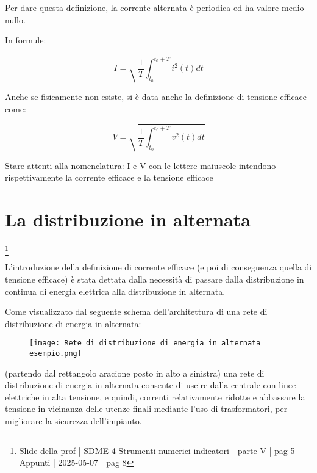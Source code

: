 Per dare questa definizione, la corrente alternata è periodica ed ha valore medio nullo. \newline 

In formule: 

{
    \Large 
    \begin{equation}
        I 
        = 
        \sqrt
        {
            \frac{1}{T}
            \int_{t_0}^{t_0 + T} 
            i^{2} (t) dt
        }
    \end{equation}
}

Anche se fisicamente non esiste, 
si è data anche la definizione di tensione efficace come: 

{
    \Large 
    \begin{equation}
        V 
        = 
        \sqrt
        {
            \frac{1}{T}
            \int_{t_0}^{t_0 + T} 
            v^{2} (t) dt
        }
    \end{equation}
}

\begin{tcolorbox}
Stare attenti alla nomenclatura: I e V con le lettere maiuscole intendono rispettivamente la corrente efficace e la tensione efficace    
\end{tcolorbox}

\newpage 

\section{La distribuzione in alternata}
\footnote{Slide della prof | SDME 4 Strumenti numerici indicatori - parte V | pag 5 \\  
Appunti | 2025-05-07 | pag 8}

L'introduzione della definizione di corrente efficace (e poi di conseguenza quella di tensione efficace) 
è stata dettata dalla necessità di passare dalla distribuzione in continua di energia elettrica alla distribuzione in alternata. \newline 

Come visualizzato dal seguente schema dell'architettura di una rete di distribuzione di energia in alternata: 

\begin{figure}[h]
    \centering
    \texttt{[image: Rete di distribuzione di energia in alternata esempio.png]}
\end{figure}

(partendo dal rettangolo aracione posto in alto a sinistra) una rete di distribuzione di energia in alternata consente di uscire dalla centrale con linee elettriche in alta tensione, 
e quindi, correnti relativamente ridotte e abbassare la tensione in vicinanza delle utenze finali mediante l'uso di trasformatori, per migliorare la sicurezza dell'impianto. \newline 

